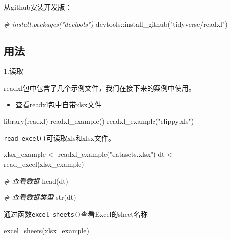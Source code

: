 \documentclass[
]{book}
\newenvironment{Shaded}{\begin{snugshade}}{\end{snugshade}}
\newcommand{\CommentTok}[1]{\textcolor[rgb]{0.56,0.35,0.01}{\textit{#1}}}
\newcommand{\FunctionTok}[1]{\textcolor[rgb]{0.00,0.00,0.00}{#1}}
\newcommand{\NormalTok}[1]{#1}
\newcommand{\OtherTok}[1]{\textcolor[rgb]{0.56,0.35,0.01}{#1}}
\newcommand{\SpecialCharTok}[1]{\textcolor[rgb]{0.00,0.00,0.00}{#1}}
\newcommand{\StringTok}[1]{\textcolor[rgb]{0.31,0.60,0.02}{#1}}
\providecommand{\tightlist}{%
  \setlength{\itemsep}{0pt}\setlength{\parskip}{0pt}}
\begin{document}
从github安装开发版：

\begin{Shaded}
\begin{Highlighting}[]
\CommentTok{\# install.packages("devtools")}
\NormalTok{devtools}\SpecialCharTok{::}\FunctionTok{install\_github}\NormalTok{(}\StringTok{"tidyverse/readxl"}\NormalTok{)}
\end{Highlighting}
\end{Shaded}

\hypertarget{readxl:usage}{%
\subsection{用法}\label{readxl:usage}}

1.读取

readxl包中包含了几个示例文件，我们在接下来的案例中使用。

\begin{itemize}
\tightlist
\item
  查看readxl包中自带xlsx文件
\end{itemize}

\begin{Shaded}
\begin{Highlighting}[]
\FunctionTok{library}\NormalTok{(readxl)}
\FunctionTok{readxl\_example}\NormalTok{()}
\FunctionTok{readxl\_example}\NormalTok{(}\StringTok{"clippy.xls"}\NormalTok{)}
\end{Highlighting}
\end{Shaded}

\texttt{read\_excel()}可读取xls和xlsx文件。

\begin{Shaded}
\begin{Highlighting}[]
\NormalTok{xlsx\_example }\OtherTok{\textless{}{-}} \FunctionTok{readxl\_example}\NormalTok{(}\StringTok{"datasets.xlsx"}\NormalTok{)}
\NormalTok{dt }\OtherTok{\textless{}{-}} \FunctionTok{read\_excel}\NormalTok{(xlsx\_example)}

\CommentTok{\# 查看数据}
\FunctionTok{head}\NormalTok{(dt)}

\CommentTok{\# 查看数据类型}
\FunctionTok{str}\NormalTok{(dt)}
\end{Highlighting}
\end{Shaded}

通过函数\texttt{excel\_sheets()}查看Excel的sheet名称

\begin{Shaded}
\begin{Highlighting}[]
\FunctionTok{excel\_sheets}\NormalTok{(xlsx\_example)}
\end{Highlighting}
\end{Shaded}
\end{document}
